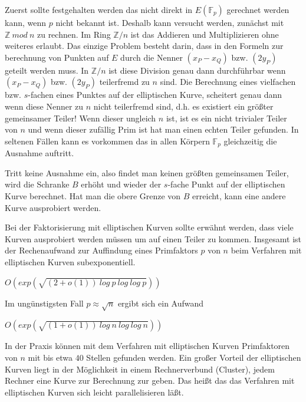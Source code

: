 \documentclass[a4paper,11pt]{article}
\begin{document}
Zuerst sollte festgehalten werden das nicht direkt in 
$E(\mathbb F_p)$ gerechnet werden kann, wenn $p$ nicht bekannt ist. Deshalb kann
versucht werden, zunächst mit $\mathbb Z\ mod\ n$ zu rechnen. Im Ring 
$\mathbb Z/n$ ist das Addieren und Multiplizieren ohne weiteres erlaubt. Das 
einzige Problem besteht darin, dass in den Formeln zur berechnung von Punkten
auf $E$ durch die Nenner $(x_P-x_Q)$ bzw. $(2y_P)$ geteilt werden muss. In 
$\mathbb Z/n$ ist diese Division genau dann durchführbar wenn $(x_P-x_Q)$ bzw.
 $(2y_P)$ teilerfremd zu $n$ sind. Die Berechnung eines vielfachen bzw. 
$s$-fachen eines Punktes auf der elliptischen Kurve, scheitert genau dann
wenn diese Nenner zu $n$ nicht teilerfremd sind, d.h. es existiert ein
größter gemeinsamer Teiler! Wenn dieser ungleich $n$ ist, ist es ein nicht 
trivialer Teiler von $n$ und wenn dieser zufällig Prim ist hat man einen 
echten Teiler gefunden. In seltenen Fällen kann es vorkommen das in allen 
Körpern $\mathbb F_p$ gleichzeitig die Ausnahme auftritt. 

Tritt keine Ausnahme ein, also findet man keinen größten gemeinsamen Teiler,
wird die Schranke $B$ erhöht und wieder der $s$-fache Punkt auf der elliptischen
Kurve berechnet. Hat man die obere Grenze von $B$ erreicht, kann eine andere 
Kurve ausprobiert werden. 

Bei der Faktorisierung mit elliptischen Kurven sollte erwähnt werden, dass viele
Kurven ausprobiert werden müssen um auf einen Teiler zu kommen. Insgesamt ist
der Rechenaufwand zur Auffindung eines Primfaktors $p$ von $n$ beim Verfahren
mit elliptischen Kurven subexponentiell. 
\begin{center}
$O(exp(\sqrt{(2+o(1))\ log\ p\ log\ log\ p}))$
\end{center}
Im ungünstigsten Fall $p\approx \sqrt{n}$ ergibt sich ein Aufwand 
\begin{center}
$O(exp(\sqrt{(1+o(1))\ log\ n\ log\ log\ n}))$
\end{center}
In der Praxis können mit dem Verfahren mit elliptischen Kurven Primfaktoren von 
$n$ mit bis etwa $40$ Stellen gefunden werden. Ein großer Vorteil der elliptischen
Kurven liegt in der Möglichkeit in einem Rechnerverbund (Cluster), jedem Rechner
eine Kurve zur Berechnung zur geben. Das heißt das das Verfahren mit elliptischen
Kurven sich leicht parallelisieren läßt.
\end{document}
